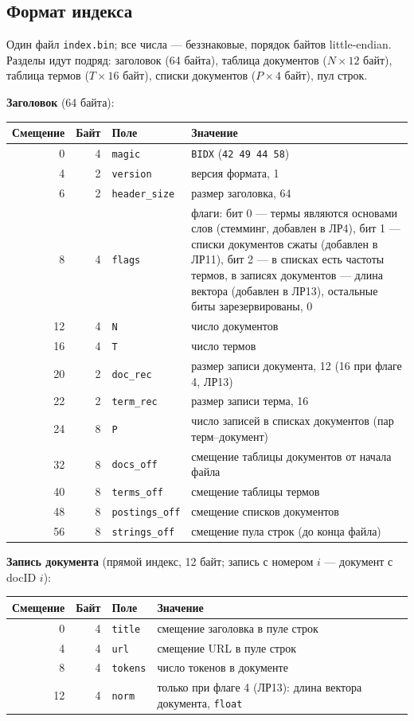 \subsection{Формат индекса}
Один файл \texttt{index.bin}; все числа --- беззнаковые, порядок байтов little-endian. Разделы идут подряд: заголовок (64 байта), таблица документов ($N \times 12$ байт), таблица термов ($T \times 16$ байт), списки документов ($P \times 4$ байт), пул строк.

\textbf{Заголовок} (64 байта):
\begin{center}
\small
\begin{tabular}{|r|r|l|p{}|}
\hline
Смещение & Байт & Поле & Значение \\
\hline
0 & 4 & \texttt{magic} & \texttt{BIDX} (\texttt{42 49 44 58}) \\
4 & 2 & \texttt{version} & версия формата, 1 \\
6 & 2 & \texttt{header\_size} & размер заголовка, 64 \\
8 & 4 & \texttt{flags} & флаги: бит 0 --- термы являются основами слов (стемминг, добавлен в ЛР4), бит 1 --- списки документов сжаты (добавлен в ЛР11), бит 2 --- в списках есть частоты термов, в записях документов --- длина вектора (добавлен в ЛР13), остальные биты зарезервированы, 0 \\
12 & 4 & \texttt{N} & число документов \\
16 & 4 & \texttt{T} & число термов \\
20 & 2 & \texttt{doc\_rec} & размер записи документа, 12 (16 при флаге 4, ЛР13) \\
22 & 2 & \texttt{term\_rec} & размер записи терма, 16 \\
24 & 8 & \texttt{P} & число записей в списках документов (пар терм--документ) \\
32 & 8 & \texttt{docs\_off} & смещение таблицы документов от начала файла \\
40 & 8 & \texttt{terms\_off} & смещение таблицы термов \\
48 & 8 & \texttt{postings\_off} & смещение списков документов \\
56 & 8 & \texttt{strings\_off} & смещение пула строк (до конца файла) \\
\hline
\end{tabular}
\end{center}

\textbf{Запись документа} (прямой индекс, 12 байт; запись с номером $i$ --- документ с docID $i$):
\begin{center}
\small
\begin{tabular}{|r|r|l|p{}|}
\hline
Смещение & Байт & Поле & Значение \\
\hline
0 & 4 & \texttt{title} & смещение заголовка в пуле строк \\
4 & 4 & \texttt{url} & смещение URL в пуле строк \\
8 & 4 & \texttt{tokens} & число токенов в документе \\
12 & 4 & \texttt{norm} & только при флаге 4 (ЛР13): длина вектора документа, \texttt{float} \\
\hline
\end{tabular}
\end{center}

